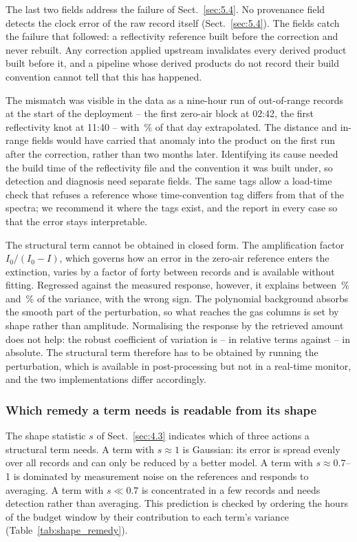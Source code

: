 The last two fields address the failure of Sect.~\ref{sec:5.4}. No provenance field detects the clock error of the
raw record itself (Sect.~\ref{sec:5.4}). The fields catch the failure that followed: a reflectivity reference built before the
correction and never rebuilt. Any correction applied upstream invalidates every derived product built before it, and
a pipeline whose derived products do not record their build convention cannot tell that this has happened.

The mismatch was visible in the data as a nine-hour run of out-of-range records at the start of the deployment -- the
first zero-air block at 02:42, the first reflectivity knot at 11:40 -- with \,\% of that day extrapolated. The
distance and in-range fields would have carried that anomaly into the product on the first run after the correction,
rather than two months later. Identifying its cause needed the build time of the reflectivity file and the convention
it was built under, so detection and diagnosis need separate fields. The same tags allow a load-time check that refuses a reference whose time-convention tag differs from that of the
spectra; we recommend it where the tags exist, and the report in every case so that the error stays interpretable.

The structural term cannot be obtained in closed form. The amplification factor $I_0/(I_0-I)$, which governs how an
error in the zero-air reference enters the extinction, varies by a factor of forty between records and is available
without fitting. Regressed against the measured response, however, it explains between \,\% and \,\% of the
variance, with the wrong sign. The polynomial background absorbs the smooth part of the perturbation, so what reaches
the gas columns is set by shape rather than amplitude. Normalising the response by the retrieved amount does not help: the
robust coefficient of variation is -- in relative terms against -- in absolute. The structural
term therefore has to be obtained by running the perturbation, which is available in post-processing but not in a
real-time monitor, and the two implementations differ accordingly.

\subsubsection{Which remedy a term needs is readable from its shape}
\label{sec:6.1a}

The shape statistic $s$ of Sect.~\ref{sec:4.3} indicates which of three actions a structural term needs. A term with
$s \approx 1$ is Gaussian: its error is spread evenly over all records and can only be reduced by a better model. A term
with $s \approx 0.7$--1 is dominated by measurement noise on the references and responds to averaging. A term with
$s \ll 0.7$ is concentrated in a few records and needs detection rather than averaging. This prediction is checked by
ordering the  hours of the budget window by their contribution to each term's variance
(Table~\ref{tab:shape_remedy}).

